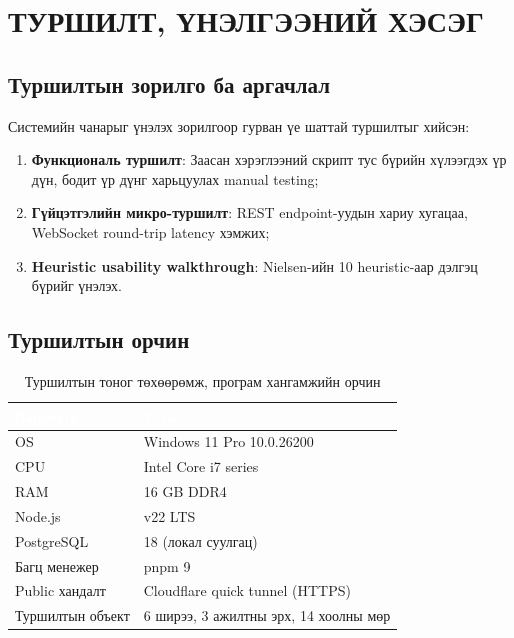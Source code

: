 \chapter{ТУРШИЛТ, ҮНЭЛГЭЭНИЙ ХЭСЭГ}
\label{ch4}
\pagecolor{white}

\section{Туршилтын зорилго ба аргачлал}

Системийн чанарыг үнэлэх зорилгоор гурван үе шаттай туршилтыг хийсэн:
\begin{enumerate}[leftmargin=*]
  \item \textbf{Функциональ туршилт}: Заасан хэрэглээний скрипт тус бүрийн
        хүлээгдэх үр дүн, бодит үр дүнг харьцуулах manual testing;
  \item \textbf{Гүйцэтгэлийн микро-туршилт}: REST endpoint-уудын хариу хугацаа,
        WebSocket round-trip latency хэмжих;
  \item \textbf{Heuristic usability walkthrough}: Nielsen-ийн 10 heuristic-аар
        дэлгэц бүрийг үнэлэх.
\end{enumerate}

\section{Туршилтын орчин}

\begin{table}[htbp]
\caption{Туршилтын тоног төхөөрөмж, програм хангамжийн орчин}
\label{tab:envtest}
\centering
\begin{tabularx}{\textwidth}{|l|L|}
\hline
{}
\textcolor{white}{\textbf{Параметр}} &
\textcolor{white}{\textbf{Утга}} \\ \hline
OS               & Windows 11 Pro 10.0.26200 \\ \hline
{}
CPU              & Intel Core i7 series \\ \hline
RAM              & 16 GB DDR4 \\ \hline
{}
Node.js          & v22 LTS \\ \hline
PostgreSQL       & 18 (локал суулгац) \\ \hline
{}
Багц менежер     & pnpm 9 \\ \hline
Public хандалт   & Cloudflare quick tunnel (HTTPS) \\ \hline
{}
Туршилтын объект & 6 ширээ, 3 ажилтны эрх, 14 хоолны мөр \\ \hline
\end{tabularx}
\end{table}

